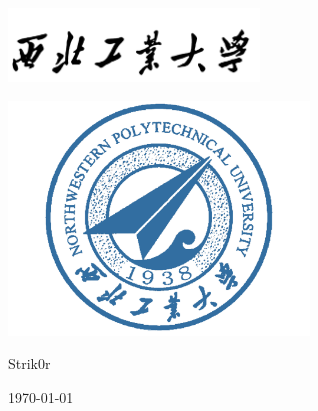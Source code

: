 \begin{titlepage}
    \centering
        \vspace*{6em}
        \includegraphics[width=0.5\textwidth]{pic/npu_2.png}\par
        \vspace{1em}
        \includegraphics[width=0.6\textwidth]{pic/npu_1.png}\par
    \vspace{1em}
        \begin{center}
            {\bfseries \Huge \thetitle}

            {\Huge \thesubtitle}
        \end{center}

        \vspace*{7em}
        \begin{center}
            \large
            Strik0r
            
            \today
        \end{center}
\end{titlepage}